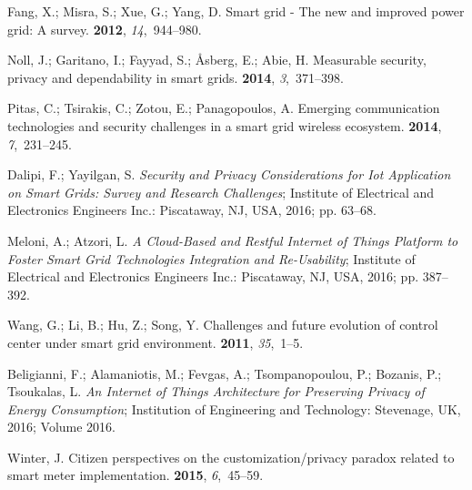 \documentclass[symmetry,article,accept,moreauthors,pdftex10pt,a4paper]{mdpi}
\begin{document}
\begin{thebibliography}{999}
Fang, X.; Misra, S.; Xue, G.; Yang, D.
\newblock Smart grid - The new and improved power grid: A survey.
 {\bf 2012}, {\em
	14},~944--980.

Noll, J.; Garitano, I.; Fayyad, S.; Åsberg, E.; Abie, H.
\newblock Measurable security, privacy and dependability in smart grids.
 {\bf 2014}, {\em
	3},~371--398.

Pitas, C.; Tsirakis, C.; Zotou, E.; Panagopoulos, A.
\newblock Emerging communication technologies and security challenges in a
smart grid wireless ecosystem.
 {\bf
	2014}, {\em 7},~231--245.

Dalipi, F.; Yayilgan, S.
\newblock \emph{Security and Privacy Considerations for Iot Application on Smart
	Grids: Survey and Research Challenges};
\newblock Institute of Electrical and Electronics Engineers Inc.: Piscataway, NJ, USA, 2016; pp.
63--68.

Meloni, A.; Atzori, L.
\newblock \emph{A Cloud-Based and Restful Internet of Things Platform to Foster Smart
	Grid Technologies Integration and Re-Usability};
\newblock Institute of Electrical and Electronics Engineers Inc.: Piscataway, NJ, USA, 2016; pp.
387--392.

Wang, G.; Li, B.; Hu, Z.; Song, Y.
\newblock Challenges and future evolution of control center under smart grid
environment.
 {\bf 2011}, {\em
	35},~1--5.

Beligianni, F.; Alamaniotis, M.; Fevgas, A.; Tsompanopoulou, P.; Bozanis, P.;
Tsoukalas, L.
\newblock \emph{An Internet of Things Architecture for Preserving Privacy of Energy
	Consumption};
\newblock Institution of Engineering and Technology: Stevenage, UK, 2016; Volume 2016.

Winter, J.
\newblock Citizen perspectives on the customization/privacy paradox related to
smart meter implementation.
 {\bf 2015}, {\em
	6},~45--59.


\end{thebibliography}
\end{document}
